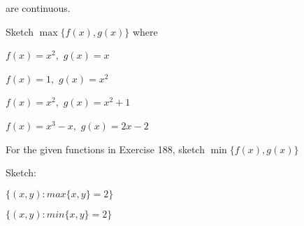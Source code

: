 \documentclass[11pt]{amsbook}
\begin{document}
\begin{hEnumerateArabic}
        are continuous.
        
        \item{ Sketch $\max{\{ f(x), g(x) \}}$ where}
        
            \begin{hEnumerateAlpha}
                \begin{multicols}{2}
                    \item $f(x) = x^2 ,$ $ g(x) = x$
                \columnbreak
                    \item $f(x) = 1 ,$ $ g(x) = x^2$
                \end{multicols}

                \begin{multicols}{2}
                    \item $f(x) = x^2 ,$ $ g(x) = x^2 + 1$
                \columnbreak
                    \item $f(x) = x^3 - x ,$ $ g(x) = 2x - 2$
                \end{multicols}
            \end{hEnumerateAlpha}
        
        \item{For the given functions in Exercise 188, sketch $\min{\{ f(x), g(x) \}}$ }
        
        \item{Sketch: }
            \begin{hEnumerateAlpha}
                \begin{multicols}{2}
                    \item $\{(x , y) : max{\{x,y\}} = 2\}$
                \columnbreak
                    \item $\{(x , y) : min{\{x,y\}} = 2\}$
                \end{multicols}
            \end{hEnumerateAlpha}
        
    \end{hEnumerateArabic}
\end{document}
